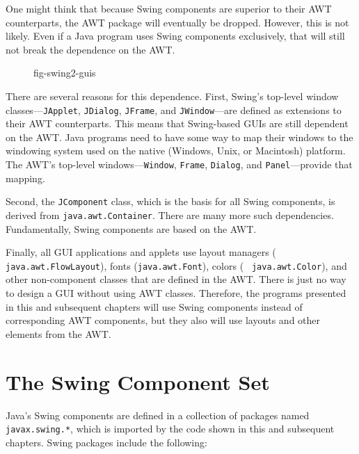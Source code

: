 One might think that because Swing components are superior
to their AWT counterparts, the AWT package will eventually be dropped.
However, this is not likely. Even if a Java program uses Swing
components exclusively, that will still not break the dependence on
the AWT.

\begin{figure}[tb]
 {fig-swing2-guis}

\end{figure}

There are several reasons for this dependence. First, Swing's
top-level window classes---{\tt JApplet}, {\tt JDialog}, {\tt JFrame},
and {\tt JWindow}---are defined as extensions to their AWT
counterparts.  This means that Swing-based GUIs are still dependent on
the AWT. Java programs need to have some way to map their windows to
the windowing system used on the native (Windows, Unix, or Macintosh)
platform.  The AWT's top-level windows---{\tt Window}, {\tt Frame},
{\tt Dialog}, and {\tt Panel}---provide that mapping.

Second, the {\tt JComponent} class, which is the basis for all Swing
components, is derived from {\tt java.awt.Container}. There are many
more such dependencies.  Fundamentally, Swing components are based on
the AWT.

Finally, all GUI applications and applets use layout managers ({\tt
java.\-awt.FlowLayout}), fonts ({\tt java.awt.Font}), colors ( {\tt
java.awt.Color}), and other non-component classes that are defined in
the AWT. There is just no way to design a GUI without using AWT classes.
Therefore, the programs presented in this and subsequent chapters will
use Swing components instead of corresponding AWT components, but
they also will use layouts and other elements from the AWT.



\section{The Swing Component Set}

\noindent Java's Swing components are defined in a
collection of packages named {\tt javax.swing.*}, which is imported by
the code shown in this and subsequent chapters.  Swing packages
include the following:


